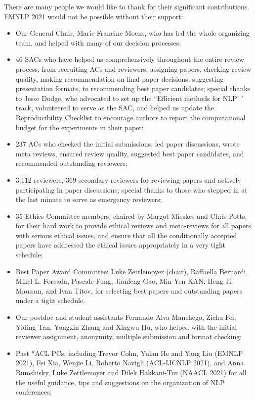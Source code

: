 There are many people we would like to thank for their significant contributions. EMNLP 2021 would not be possible without their support:

\begin{itemize}

 \item Our General Chair, Marie-Francine Moens, who has led the whole organizing team, and helped with many of our decision processes;
\item 46 SACs who have helped us comprehensively throughout the entire review process, from recruiting ACs and reviewers, assigning papers, checking review quality, making recommendation on final paper decisions, suggesting presentation formats, to recommending best paper candidates; special thanks to Jesse Dodge, who advocated to set up the ``Efficient methods for NLP' '  track, volunteered to serve as the SAC, and helped us update the Reproducibility Checklist to encourage authors to report the computational budget for the experiments in their paper;
\item 237 ACs who checked the initial submissions, led paper discussions, wrote meta reviews, ensured review quality, suggested best paper candidates, and recommended outstanding reviewers;
\newpage
\item 3,112 reviewers, 369 secondary reviewers for reviewing papers and actively participating in paper discussions; special thanks to those who stepped in at the last minute to serve as emergency reviewers;
\item 35 Ethics Committee members, chaired by Margot Mieskes and Chris Potts, for their hard work to provide ethical reviews and meta-reviews for all papers with serious ethical issues, and ensure that all the conditionally accepted papers have addressed the ethical issues appropriately in a very tight schedule;
\item Best Paper Award Committee: Luke Zettlemoyer (chair), Raffaella Bernardi, Mikel L. Forcada, Pascale Fung, Jianfeng Gao, Min Yen KAN, Heng Ji, Mausam, and Ivan Titov, for selecting best papers and outstanding papers under a tight schedule.
\item Our postdoc and student assistants Fernando Alva-Manchego, Zichu Fei, Yiding Tan, Yongxin Zhang and Xingwu Hu, who helped with the initial reviewer assignment, anonymity, multiple submission and format checking;
\item Past *ACL PCs, including Trevor Cohn, Yulan He and Yang Liu (EMNLP 2021), Fei Xia, Wenjie Li, Roberto Navigli (ACL-IJCNLP 2021), and  Anna Rumshisky, Luke Zettlemoyer and Dilek Hakkani-Tur (NAACL 2021) for all the useful guidance, tips and suggestions on the organization of NLP conferences;

\end{itemize}
